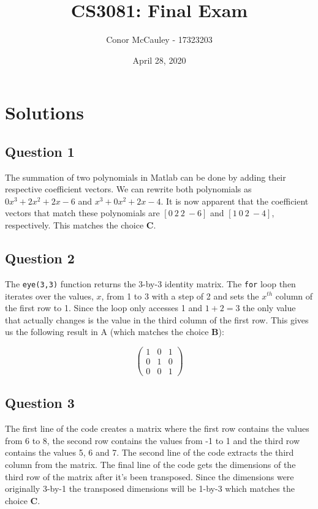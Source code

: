 \documentclass[12pt]{article}
\title{\vspace{-5ex}CS3081: Final Exam\vspace{-2.5ex}}
\author{Conor McCauley - 17323203}
\date{\vspace{-2ex}April 28, 2020\vspace{-2ex}}
\begin{document}
\maketitle

\section*{Solutions}

\subsection*{Question 1}

The summation of two polynomials in Matlab can be done by adding their respective coefficient vectors. We can rewrite both polynomials as $0x^3 + 2x^2 + 2x - 6$ and $x^3 + 0x^2 +2x - 4$. It is now apparent that the coefficient vectors that match these polynomials are $[0\: 2\: 2\: -6]$ and $[1\: 0\: 2\: -4]$, respectively. This matches the choice \textbf{C}.

\subsection*{Question 2}

The \texttt{eye(3,3)} function returns the 3-by-3 identity matrix. The \texttt{for} loop then iterates over the values, $x$, from 1 to 3 with a step of 2 and sets the $x^{th}$ column of the first row to 1. Since the loop only accesses 1 and $1 + 2 = 3$ the only value that actually changes is the value in the third column of the first row. This gives us the following result in A (which matches the choice \textbf{B}):

$$
\begin{pmatrix}
    1 & 0 & 1 \\
    0 & 1 & 0 \\
    0 & 0 & 1
\end{pmatrix}
$$

\subsection*{Question 3}

The first line of the code creates a matrix where the first row contains the values from 6 to 8, the second row contains the values from -1 to 1 and the third row contains the values 5, 6 and 7. The second line of the code extracts the third column from the matrix. The final line of the code gets the dimensions of the third row of the matrix after it's been transposed. Since the dimensions were originally 3-by-1 the transposed dimensions will be 1-by-3 which matches the choice \textbf{C}.
\end{document}

